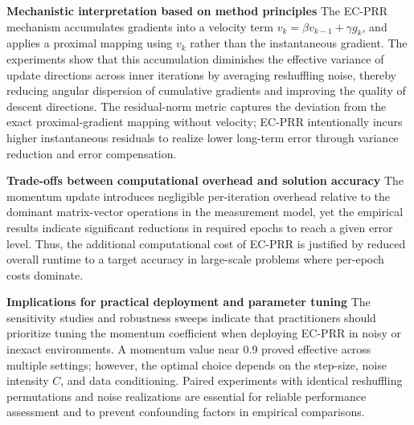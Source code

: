 \documentclass{article}
\begin{document}
\textbf{Mechanistic interpretation based on method principles} The EC-PRR mechanism accumulates gradients into a velocity term $v_k=\beta v_{k-1}+\gamma g_k$, and applies a proximal mapping using $v_k$ rather than the instantaneous gradient. The experiments show that this accumulation diminishes the effective variance of update directions across inner iterations by averaging reshuffling noise, thereby reducing angular dispersion of cumulative gradients and improving the quality of descent directions. The residual-norm metric captures the deviation from the exact proximal-gradient mapping without velocity; EC-PRR intentionally incurs higher instantaneous residuals to realize lower long-term error through variance reduction and error compensation.

\textbf{Trade-offs between computational overhead and solution accuracy} The momentum update introduces negligible per-iteration overhead relative to the dominant matrix-vector operations in the measurement model, yet the empirical results indicate significant reductions in required epochs to reach a given error level. Thus, the additional computational cost of EC-PRR is justified by reduced overall runtime to a target accuracy in large-scale problems where per-epoch costs dominate.

\textbf{Implications for practical deployment and parameter tuning} The sensitivity studies and robustness sweeps indicate that practitioners should prioritize tuning the momentum coefficient when deploying EC-PRR in noisy or inexact environments. A momentum value near 0.9 proved effective across multiple settings; however, the optimal choice depends on the step-size, noise intensity $C$, and data conditioning. Paired experiments with identical reshuffling permutations and noise realizations are essential for reliable performance assessment and to prevent confounding factors in empirical comparisons.
\end{document}
